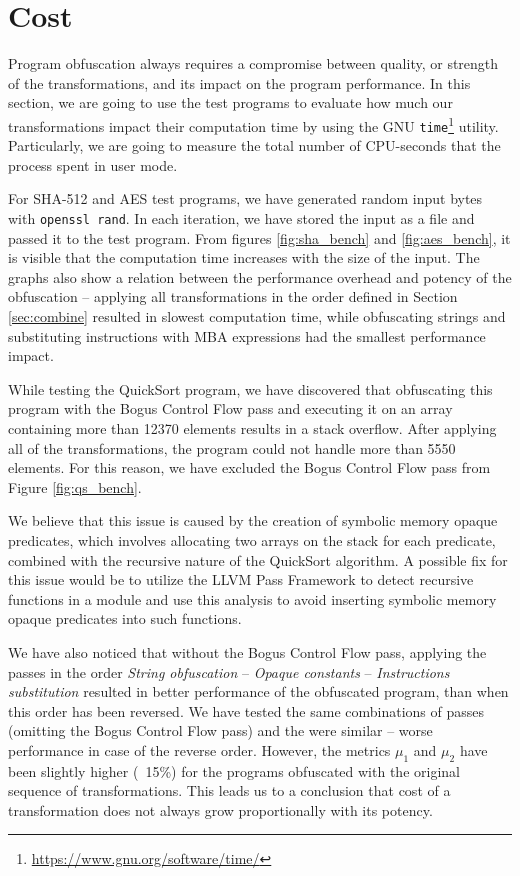 \documentclass[
  digital, %
  notable,   %
  twoside, %
  nolof,     %
  nolot,     %
]{fithesis3}
\theoremstyle{definition}
\begin{document}
\section{Cost}
Program obfuscation always requires a compromise between quality, or strength of the transformations, and its impact on the program performance. In this section, we are going to use the test programs to evaluate how much our transformations impact their computation time by using the GNU \texttt{time}\footnote{\url{https://www.gnu.org/software/time/}} utility. Particularly, we are going to measure the total number of CPU-seconds that the process spent in user mode. 

For SHA-512 and AES test programs, we have generated random input bytes with \texttt{openssl rand}. In each iteration, we have stored the input as a file and passed it to the test program. From figures \ref{fig:sha_bench} and \ref{fig:aes_bench}, it is visible that the computation time increases with the size of the input. The graphs also show a relation between the performance overhead and potency of the obfuscation -- applying all transformations in the order defined in Section \ref{sec:combine} resulted in slowest computation time, while obfuscating strings and substituting instructions with MBA expressions had the smallest performance impact. 

While testing the QuickSort program, we have discovered that obfuscating this program with the Bogus Control Flow pass and executing it on an array containing more than 12370 elements results in a stack overflow. After applying all of the transformations, the program could not handle more than 5550 elements. For this reason, we have excluded the Bogus Control Flow pass from Figure \ref{fig:qs_bench}.

We believe that this issue is caused by the creation of symbolic memory opaque predicates, which involves allocating two arrays on the stack for each predicate, combined with the recursive nature of the QuickSort algorithm. A possible fix for this issue would be to utilize the LLVM Pass Framework to detect recursive functions in a module and use this analysis to avoid inserting symbolic memory opaque predicates into such functions.

We have also noticed that without the Bogus Control Flow pass, applying the passes in the order \textit{String obfuscation} -- \textit{Opaque constants} -- \textit{Instructions substitution} resulted in better performance of the obfuscated program, than when this order has been reversed. We have tested the same combinations of passes (omitting the Bogus Control Flow pass) and the were similar -- worse performance in case of the reverse order. However, the metrics $\mu_1$ and $\mu_2$ have been slightly higher (~15\%) for the programs obfuscated with the original sequence of transformations. This leads us to a conclusion that cost of a transformation does not always grow proportionally with its potency.
\end{document}
